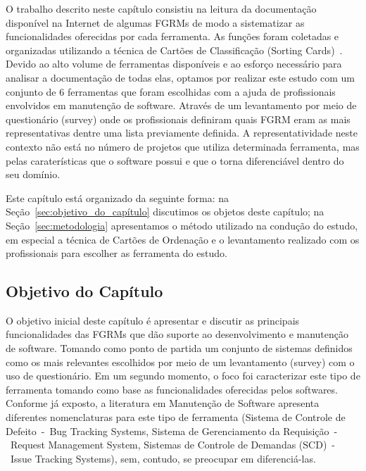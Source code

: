 O trabalho descrito neste capítulo consistiu na leitura da documentação
disponível na Internet de algumas FGRMs de modo a sistematizar as
funcionalidades o\-fe\-re\-ci\-das por cada ferramenta. As funções foram
coletadas e organizadas utilizando a técnica de Cartões de Classificação
(Sorting Cards)~\cite{5070993, rugg2005sorting}. Devido ao alto volume de
ferramentas disponíveis e ao esforço necessário para analisar a documentação de
todas elas, optamos por realizar este estudo com um conjunto de 6 ferramentas
que foram escolhidas com a ajuda de profissionais envolvidos em manutenção de
software. Através de um levantamento por meio de questionário (survey) onde os
profissionais definiram quais FGRM eram as mais representativas dentre uma lista
previamente definida. A representatividade neste contexto não está no número de
projetos que utiliza determinada ferramenta, mas pelas caraterísticas que o
software possui e que o torna diferenciável dentro do seu domínio.

Este capítulo está organizado da seguinte forma: na
Seção~\ref{sec:objetivo_do_capítulo} discutimos os objetos deste capítulo; na
Seção~\ref{sec:metodologia} apresentamos o método utilizado na condução do
estudo, em especial a técnica de Cartões de Ordenação e o levantamento realizado
com os profissionais para escolher as ferramenta do estudo.
\todoend{}

\subsection{Objetivo do Capítulo}
\label{subsec:caracterizacao_objetivo_do_capitulo}

O objetivo inicial deste capítulo é apresentar e discutir as principais
funcionalidades das FGRMs que dão suporte ao desenvolvimento e manutenção de
software. Tomando como ponto de partida um conjunto de sistemas definidos como
os mais relevantes escolhidos por meio de um levantamento (survey) com o uso de
questionário. Em um segundo momento, o foco foi caracterizar este tipo de
ferramenta tomando como base as funcionalidades oferecidas pelos softwares.
Conforme já exposto, a literatura em Manutenção de Software apresenta diferentes
nomenclaturas para este tipo de ferramenta (Sistema de Controle de Defeito~-~Bug
Tracking Systems, Sistema de Gerenciamento da Requisição~-~Request Management
System, Sistemas de Controle de Demandas (SCD)~-~Issue Tracking Systems), sem,
contudo, se preocupar em diferenciá-las.

